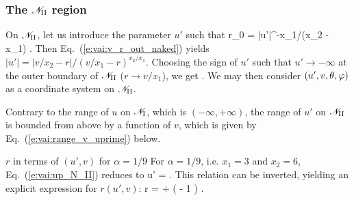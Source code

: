 \subsubsection{The $\mathscr{N}_{\rm II}$ region}

On $\mathscr{N}_{\rm II}$, let us introduce the parameter $u'$ such that
\be \label{e:vai:def_up_tilde_c}
    r_0 = |u'|^{-x_1/(x_2 - x_1)} .
\ee
Then Eq.~(\ref{e:vai:v_r_out_naked}) yields $|u'| = |v/x_2 - r| / (v/x_1 - r)^{x_2/x_1}$.
Choosing the sign of $u'$ such that $u'\to -\infty$ at the outer boundary of
$\mathscr{N}_{\rm II}$ ($r\to v/x_1$), we get
\be \label{e:vai:up_N_II}
    .
\ee
We may then consider $(u',v,\theta,\varphi)$ as a coordinate system on $\mathscr{N}_{\rm II}$.

\begin{remark}
Contrary to the range of $u$ on $\mathscr{N}_{\rm I}$, which is $(-\infty,+\infty)$,
the range of $u'$ on $\mathscr{N}_{\rm II}$ is bounded from above by a function
of $v$, which is given by Eq.~(\ref{e:vai:range_v_uprime}) below.
\end{remark}

\begin{texample}{$r$ in terms of $(u', v)$ for $\alpha=1/9$}{}
For $\alpha=1/9$, i.e. $x_1 = 3$ and $x_2 = 6$,
Eq.~(\ref{e:vai:up_N_II}) reduces to
\be \label{e:vai:up_v_r_alp1o9}
    u' =  .
\ee
This relation can be inverted, yielding  an explicit expression for $r(u', v)$:
\be \label{e:vai:r_up_v_alp1o9}
    r =  +  \left(  - 1 \right) .
\ee
\end{texample}

